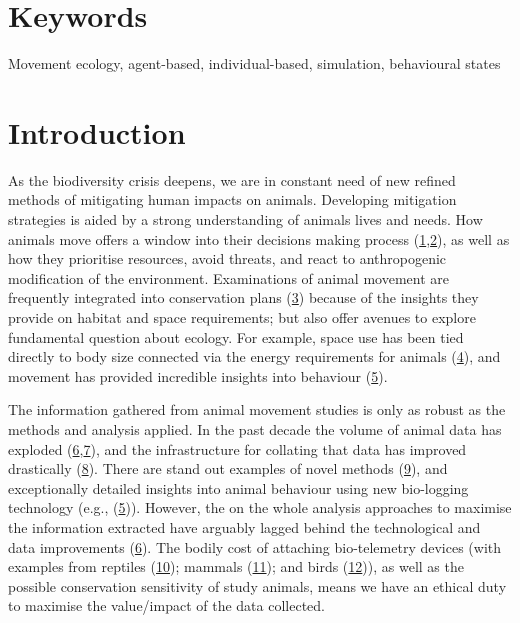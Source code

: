 \documentclass[10pt,a4paper]{article}
\begin{document}
\section*{\color{f1ROrange}Keywords}

Movement ecology, agent-based, individual-based, simulation, behavioural states

\clearpage
\pagestyle{fancy}

\hypertarget{main}{%
\section{Introduction}\label{main}}

As the biodiversity crisis deepens, we are in constant need of new refined methods of mitigating human impacts on animals.
Developing mitigation strategies is aided by a strong understanding of animals lives and needs.
How animals move offers a window into their decisions making process (\protect\hyperlink{ref-Bastille-Rousseau2017}{1},\protect\hyperlink{ref-sridhar_geometry_2021}{2}), as well as how they prioritise resources, avoid threats, and react to anthropogenic modification of the environment.
Examinations of animal movement are frequently integrated into conservation plans (\protect\hyperlink{ref-Fraser2018}{3}) because of the insights they provide on habitat and space requirements; but also offer avenues to explore fundamental question about ecology.
For example, space use has been tied directly to body size connected via the energy requirements for animals (\protect\hyperlink{ref-noonan_effects_2020}{4}), and movement has provided incredible insights into behaviour (\protect\hyperlink{ref-studd_purrfect_2021}{5}).

The information gathered from animal movement studies is only as robust as the methods and analysis applied.
In the past decade the volume of animal data has exploded (\protect\hyperlink{ref-joo_recent_2022}{6},\protect\hyperlink{ref-wild_internet_2022}{7}), and the infrastructure for collating that data has improved drastically (\protect\hyperlink{ref-kays_movebank_2022}{8}).
There are stand out examples of novel methods (\protect\hyperlink{ref-saunders_radio-tracking_2022}{9}), and exceptionally detailed insights into animal behaviour using new bio-logging technology (e.g., (\protect\hyperlink{ref-studd_purrfect_2021}{5})).
However, the on the whole analysis approaches to maximise the information extracted have arguably lagged behind the technological and data improvements (\protect\hyperlink{ref-joo_recent_2022}{6}).
The bodily cost of attaching bio-telemetry devices (with examples from reptiles (\protect\hyperlink{ref-Weatherhead2004}{10}); mammals (\protect\hyperlink{ref-robstad_impact_2021}{11}); and birds (\protect\hyperlink{ref-portugal_externally_2022}{12})), as well as the possible conservation sensitivity of study animals, means we have an ethical duty to maximise the value/impact of the data collected.
\end{document}
